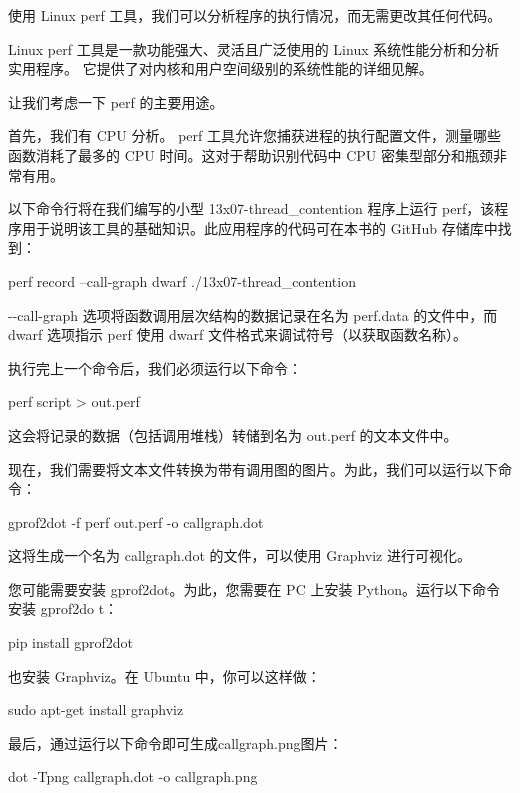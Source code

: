 使用 Linux perf 工具，我们可以分析程序的执行情况，而无需更改其任何代码。

Linux perf 工具是一款功能强大、灵活且广泛使用的 Linux 系统性能分析和分析实用程序。
它提供了对内核和用户空间级别的系统性能的详细见解。

让我们考虑一下 perf 的主要用途。

首先，我们有 CPU 分析。 perf 工具允许您捕获进程的执行配置文件，测量哪些函数消耗了最多的 CPU 时间。这对于帮助识别代码中 CPU 密集型部分和瓶颈非常有用。

以下命令行将在我们编写的小型 13x07-thread\_contention 程序上运行 perf，该程序用于说明该工具的基础知识。此应用程序的代码可在本书的 GitHub 存储库中找到：

\begin{shell}
perf record --call-graph dwarf ./13x07-thread_contention
\end{shell}

-{}-call-graph 选项将函数调用层次结构的数据记录在名为 perf.data 的文件中，而 dwarf 选项指示 perf 使用 dwarf 文件格式来调试符号（以获取函数名称）。

执行完上一个命令后，我们必须运行以下命令：

\begin{shell}
perf script > out.perf
\end{shell}

这会将记录的数据（包括调用堆栈）转储到名为 out.perf 的文本文件中。

现在，我们需要将文本文件转换为带有调用图的图片。为此，我们可以运行以下命令：

\begin{shell}
gprof2dot -f perf out.perf -o callgraph.dot
\end{shell}

这将生成一个名为 callgraph.dot 的文件，可以使用 Graphviz 进行可视化。

您可能需要安装 gprof2dot。为此，您需要在 PC 上安装 Python。运行以下命令安装 gprof2do t：

\begin{shell}
pip install gprof2dot
\end{shell}

也安装 Graphviz。在 Ubuntu 中，你可以这样做：

\begin{shell}
sudo apt-get install graphviz
\end{shell}

最后，通过运行以下命令即可生成callgraph.png图片：

\begin{shell}
dot -Tpng callgraph.dot -o callgraph.png
\end{shell}


